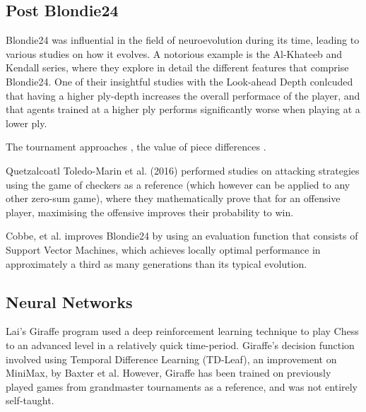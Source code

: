 \documentclass[12pt,a4paper]{article}
\begin{document}
        \subsection{Post Blondie24}

        Blondie24 was influential in the field of neuroevolution during its time, leading to various studies on how it evolves. A notorious example is the Al-Khateeb and Kendall series, where they explore in detail the different features that comprise Blondie24. One of their insightful studies with the Look-ahead Depth \cite{al-khateeb_effect_2012} conlcuded that having a higher ply-depth increases the overall performace of the player, and that agents trained at a higher ply performs significantly worse when playing at a lower ply.
        
        The tournament approaches \cite{al-khateeb_introducing_2009}, the value of piece differences \cite{al-khateeb_importance_2010}. 
        
        Quetzalcoatl Toledo-Marin et al. (2016) performed studies on attacking strategies using the game of checkers as a reference (which however can be applied to any other zero-sum game), where they mathematically prove that for an offensive player, maximising the offensive improves their probability to win.\cite{toledo-marin_is_2016}

        Cobbe, et al. improves Blondie24 by using an evaluation function that consists of Support Vector Machines, which achieves locally optimal performance in approximately a third as many generations than its typical evolution. \cite{cobbe_accelerating_nodate} 
        
    \subsection{Neural Networks}
        Lai's Giraffe \cite{lai_giraffe:_2015} program used a deep reinforcement learning technique to play Chess to an advanced level in a relatively quick time-period. Giraffe's decision function involved using Temporal Difference Learning (TD-Leaf), an improvement on MiniMax, by Baxter et al. \cite{baxter_tdleaflambda_1999} However, Giraffe has been trained on previously played games from grandmaster tournaments as a reference, and was not entirely self-taught.
\end{document}
